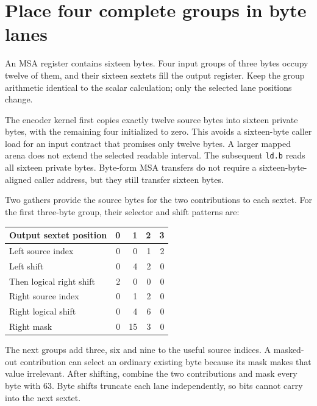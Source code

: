 \section{Place four complete groups in byte lanes}
An MSA register contains sixteen bytes. Four input groups of three bytes occupy twelve
of them, and their sixteen sextets fill the output register. Keep the group arithmetic
identical to the scalar calculation; only the selected lane positions change.

The encoder kernel first copies exactly twelve source bytes into sixteen private bytes,
with the remaining four initialized to zero. This avoids a sixteen-byte caller load
for an input contract that promises only twelve bytes. A larger mapped arena does not
extend the selected readable interval. The subsequent \texttt{ld.b} reads all sixteen
private bytes. Byte-form MSA transfers do not require a sixteen-byte-aligned caller
address, but they still transfer sixteen bytes.

Two gathers provide the source bytes for the two contributions to each sextet. For the
first three-byte group, their selector and shift patterns are:
\begin{center}
\begin{tabular}{lrrrr}
Output sextet position & 0 & 1 & 2 & 3 \\
\hline
Left source index & 0 & 0 & 1 & 2 \\
Left shift & 0 & 4 & 2 & 0 \\
Then logical right shift & 2 & 0 & 0 & 0 \\
Right source index & 0 & 1 & 2 & 0 \\
Right logical shift & 0 & 4 & 6 & 0 \\
Right mask & 0 & 15 & 3 & 0 \\
\end{tabular}
\end{center}

The next groups add three, six and nine to the useful source indices. A masked-out
contribution can select an ordinary existing byte because its mask makes that value
irrelevant. After shifting, combine the two contributions and mask every byte with 63.
Byte shifts truncate each lane independently, so bits cannot carry into the next sextet.
